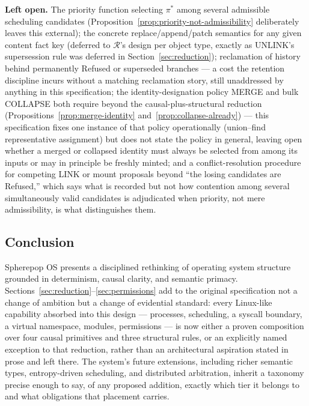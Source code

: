 \documentclass[11pt]{article}
\begin{document}
\textbf{Left open.} The priority function selecting $\pi^*$ among several admissible scheduling candidates (Proposition~\ref{prop:priority-not-admissibility} deliberately leaves this external); the concrete replace/append/patch semantics for any given $\mathrm{content}$ fact key (deferred to $\mathcal{R}$'s design per object type, exactly as UNLINK's supersession rule was deferred in Section~\ref{sec:reduction}); reclamation of history behind permanently Refused or superseded branches --- a cost the retention discipline incurs without a matching reclamation story, still unaddressed by anything in this specification; the identity-designation policy MERGE and bulk COLLAPSE both require beyond the causal-plus-structural reduction (Propositions~\ref{prop:merge-identity} and~\ref{prop:collapse-already}) --- this specification fixes one instance of that policy operationally (union--find representative assignment) but does not state the policy in general, leaving open whether a merged or collapsed identity must always be selected from among its inputs or may in principle be freshly minted; and a conflict-resolution procedure for competing LINK or mount proposals beyond ``the losing candidates are Refused,'' which says what is recorded but not how contention among several simultaneously valid candidates is adjudicated when priority, not mere admissibility, is what distinguishes them.

\subsection{Conclusion}

Spherepop OS presents a disciplined rethinking of operating system structure grounded in determinism, causal clarity, and semantic primacy. Sections~\ref{sec:reduction}--\ref{sec:permissions} add to the original specification not a change of ambition but a change of evidential standard: every Linux-like capability absorbed into this design --- processes, scheduling, a syscall boundary, a virtual namespace, modules, permissions --- is now either a proven composition over four causal primitives and three structural rules, or an explicitly named exception to that reduction, rather than an architectural aspiration stated in prose and left there. The system's future extensions, including richer semantic types, entropy-driven scheduling, and distributed arbitration, inherit a taxonomy precise enough to say, of any proposed addition, exactly which tier it belongs to and what obligations that placement carries.
\end{document}
